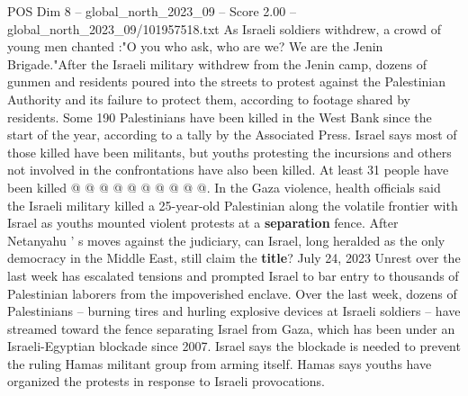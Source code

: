 \begin{textsample}{POS Dim 8 – global\_north\_2023\_09 – Score 2.00 – global\_north\_2023\_09/101957518.txt}
As Israeli soldiers withdrew, a crowd of young men chanted :"O you who ask, who are we?
We are the Jenin Brigade."After the Israeli military withdrew from the Jenin camp, dozens of gunmen and residents poured into the streets to protest against the Palestinian Authority and its failure to protect them, according to footage shared by residents.
Some 190 Palestinians have been killed in the West Bank since the start of the year, according to a tally by the Associated Press.
Israel says most of those killed have been militants, but youths protesting the incursions and others not involved in the confrontations have also been killed.
At least 31 people have been killed @ @ @ @ @ @ @ @ @ @.
In the Gaza violence, health officials said the Israeli military killed a 25-year-old Palestinian along the volatile frontier with Israel as youths mounted violent protests at a \textbf{separation} fence.
After Netanyahu ' s moves against the judiciary, can Israel, long heralded as the only democracy in the Middle East, still claim the \textbf{title}?
July 24, 2023 Unrest over the last week has escalated tensions and prompted Israel to bar entry to thousands of Palestinian laborers from the impoverished enclave.
Over the last week, dozens of Palestinians -- burning tires and hurling explosive devices at Israeli soldiers -- have streamed toward the fence separating Israel from Gaza, which has been under an Israeli-Egyptian blockade since 2007.
Israel says the blockade is needed to prevent the ruling Hamas militant group from arming itself.
Hamas says youths have organized the protests in response to Israeli provocations.

\end{textsample}
